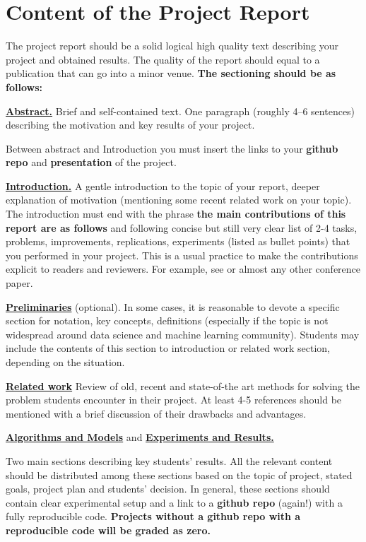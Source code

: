 \documentclass{article}
\begin{document}
\section{Content of the Project Report}
The project report should be a solid logical high quality text describing your project and obtained results. The quality of the report should equal to a publication that can go into a minor venue. \textbf{The sectioning should be as follows:}

\underline{\textbf{Abstract.}} Brief and self-contained text. One paragraph (roughly 4--6 sentences) describing the motivation and key results of your project.

Between abstract and Introduction you must insert the links to your \textbf{github repo} and \textbf{ presentation} of the project.

\underline{\textbf{Introduction.}} A gentle introduction to the topic of your report, deeper explanation of motivation (mentioning some recent related work on your topic). The introduction must end with the phrase \textbf{the main contributions of this report are as follows} and following concise but still very clear list of 2-4 tasks, problems, improvements, replications, experiments (listed as bullet points) that you performed in your project. This is a usual practice to make the contributions explicit to readers and reviewers. For example, see \cite{arjovsky2017wasserstein,NIPS20198433} or almost any other conference paper.

\underline{\textbf{Preliminaries}} (optional). In some cases, it is reasonable to devote a specific section for notation, key concepts, definitions (especially if the topic is not widespread around data science and machine learning community). Students may include the contents of this section to introduction or related work section, depending on the situation.

\underline{\textbf{Related work}} Review of old, recent and state-of-the art methods for solving the problem students encounter in their project. At least 4-5 references should be mentioned with a brief discussion of their drawbacks and advantages.

\underline{\textbf{Algorithms and Models}} and \underline{\textbf{Experiments and Results.}}

Two main sections describing key students' results. All the relevant content should be distributed among these sections based on the topic of project, stated goals, project plan and students' decision. In general, these sections should contain clear experimental setup and a  link to a \textbf{github repo} (again!) with a fully reproducible code. \textbf{Projects without a github repo with a reproducible code will be graded as zero.}
\end{document}
